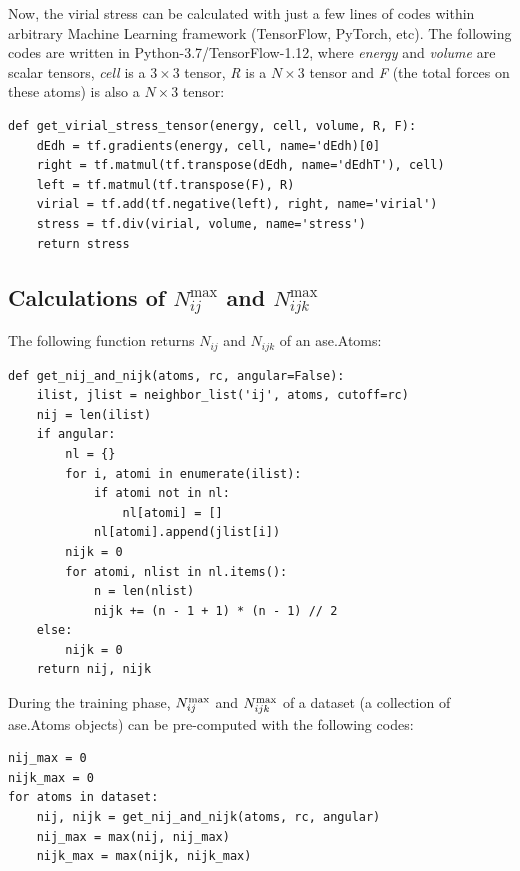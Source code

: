 \documentclass[final,1p,times]{elsarticle}
\begin{document}
Now, the virial stress can be calculated with just a few lines of codes within 
arbitrary Machine Learning framework (TensorFlow, PyTorch, etc). The following 
codes are written in Python-3.7/TensorFlow-1.12, where \textit{energy} and 
\textit{volume} are scalar tensors, \textit{cell} is a $3 \times 3$ tensor, 
\textit{R} is a $N\times 3$ tensor and \textit{F} (the total forces 
on these atoms) is also a $N\times 3$ tensor:
\begin{verbatim}
def get_virial_stress_tensor(energy, cell, volume, R, F):
    dEdh = tf.gradients(energy, cell, name='dEdh)[0]
    right = tf.matmul(tf.transpose(dEdh, name='dEdhT'), cell)
    left = tf.matmul(tf.transpose(F), R)
    virial = tf.add(tf.negative(left), right, name='virial')
    stress = tf.div(virial, volume, name='stress')
    return stress
\end{verbatim}

\newpage

% 
%
\subsection{
    Calculations of \texorpdfstring{$N_{ij}^{\mathrm{max}}$}{Nijmax} and 
    \texorpdfstring{$N_{ijk}^{\mathrm{max}}$}{Nijkmax}
}

The following function returns $N_{ij}$ and $N_{ijk}$ of an \textmd{ase.Atoms}:
\begin{verbatim}
def get_nij_and_nijk(atoms, rc, angular=False):
    ilist, jlist = neighbor_list('ij', atoms, cutoff=rc)
    nij = len(ilist)
    if angular:
        nl = {}
        for i, atomi in enumerate(ilist):
            if atomi not in nl:
                nl[atomi] = []
            nl[atomi].append(jlist[i])
        nijk = 0
        for atomi, nlist in nl.items():
            n = len(nlist)
            nijk += (n - 1 + 1) * (n - 1) // 2
    else:
        nijk = 0
    return nij, nijk
\end{verbatim}
During the training phase, $N_{ij}^{\mathrm{max}}$ and $N_{ijk}^{\mathrm{max}}$ of a dataset (a collection 
of \textmd{ase.Atoms} objects) can be pre-computed with the following codes:
\begin{verbatim}
nij_max = 0
nijk_max = 0
for atoms in dataset:
    nij, nijk = get_nij_and_nijk(atoms, rc, angular)
    nij_max = max(nij, nij_max)
    nijk_max = max(nijk, nijk_max)
\end{verbatim}
\end{document}
